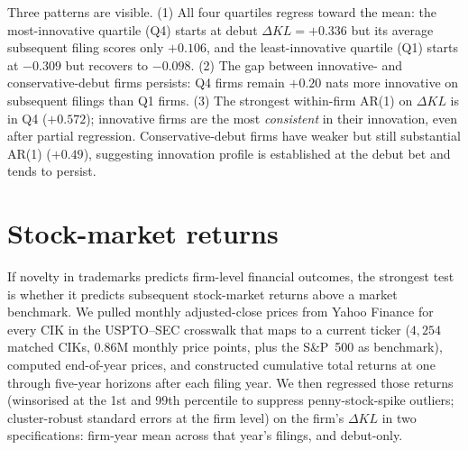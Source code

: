 \documentclass[11pt]{article}
\begin{document}
Three patterns are visible. (1) All four quartiles regress toward the
mean: the most-innovative quartile (Q4) starts at debut
$\Delta KL = +0.336$ but its average subsequent filing scores only
$+0.106$, and the least-innovative quartile (Q1) starts at $-0.309$
but recovers to $-0.098$. (2) The gap between innovative- and
conservative-debut firms persists: Q4 firms remain $+0.20$ nats more
innovative on subsequent filings than Q1 firms. (3) The strongest
within-firm AR(1) on $\Delta KL$ is in Q4 ($+0.572$); innovative
firms are the most \emph{consistent} in their innovation, even after
partial regression. Conservative-debut firms have weaker but still
substantial AR(1) ($+0.49$), suggesting innovation profile is
established at the debut bet and tends to persist.

\section{Stock-market returns}
\label{sec:returns}

If novelty in trademarks predicts firm-level financial outcomes, the
strongest test is whether it predicts subsequent stock-market returns
above a market benchmark. We pulled monthly adjusted-close prices
from Yahoo Finance for every CIK in the USPTO--SEC crosswalk that
maps to a current ticker ($4{,}254$ matched CIKs, $0.86$M monthly
price points, plus the S\&P~500 as benchmark), computed end-of-year
prices, and constructed cumulative total returns at one through
five-year horizons after each filing year. We then regressed those
returns (winsorised at the 1st and 99th percentile to suppress
penny-stock-spike outliers; cluster-robust standard errors at the
firm level) on the firm's $\Delta KL$ in two specifications:
firm-year mean across that year's filings, and debut-only.

\begin{table}[h]
\centering
\caption{Stock-return regressions on novelty. Each row is a separate
OLS regression with year linear and quadratic controls;
cluster-robust standard errors at the firm level; outcome winsorised
at p1 / p99. Coefficients are in return units per one $\sigma$ of the
predictor.}
\label{tab:returns}

\end{table}
\end{document}
